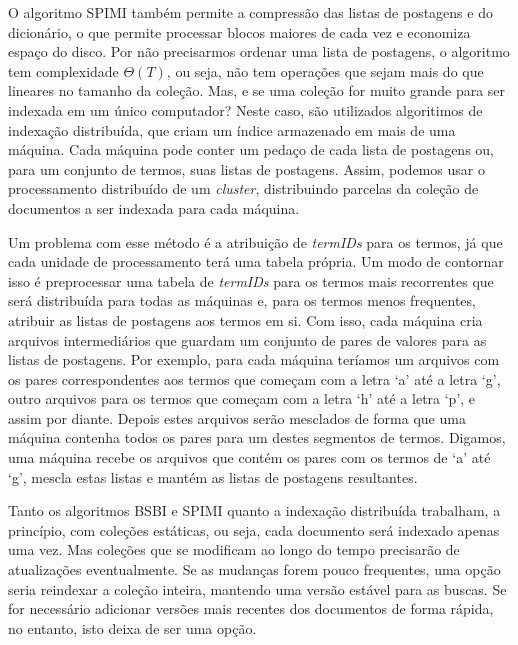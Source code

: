 O algoritmo SPIMI também permite a compressão das listas de postagens e do dicionário, o que permite processar blocos maiores de cada vez e economiza espaço do disco. Por não precisarmos ordenar uma lista de postagens, o algoritmo tem complexidade $\Theta( T )$, ou seja, não tem operações que sejam mais do que lineares no tamanho da coleção.
Mas, e se uma coleção for muito grande para ser indexada em um único computador? Neste caso, são utilizados algoritimos de indexação distribuída, que criam um índice armazenado em mais de uma máquina. Cada máquina pode conter um pedaço de cada lista de postagens ou, para um conjunto de termos, suas listas de postagens. Assim, podemos usar o processamento distribuído de um \emph{cluster}, distribuindo parcelas da coleção de documentos a ser indexada para cada máquina.

Um problema com esse método é a atribuição de \emph{termIDs} para os termos, já que cada unidade de processamento terá uma tabela própria. Um modo de contornar isso é preprocessar uma tabela de \emph{termIDs} para os termos mais recorrentes que será distribuída para todas as máquinas e, para os termos menos frequentes, atribuir as listas de postagens aos termos em si. Com isso, cada máquina cria arquivos intermediários que guardam um conjunto de pares de valores para as listas de postagens. Por exemplo, para cada máquina teríamos um arquivos com os pares correspondentes aos termos que começam com a letra `a' até a letra `g', outro arquivos para os termos que começam com a letra `h' até a letra `p', e assim por diante. Depois estes arquivos serão mesclados de forma que uma máquina contenha todos os pares para um destes segmentos de termos. Digamos, uma máquina recebe os arquivos que contém os pares com os termos de `a' até `g', mescla estas listas e mantém as listas de postagens resultantes.

Tanto os algoritmos BSBI e SPIMI quanto a indexação distribuída trabalham, a princípio, com coleções estáticas, ou seja, cada documento será indexado apenas uma vez. Mas coleções que se modificam ao longo do tempo precisarão de atualizações eventualmente. Se as mudanças forem pouco frequentes, uma opção seria reindexar a coleção inteira, mantendo uma versão estável para as buscas. Se for necessário adicionar versões mais recentes dos documentos de forma rápida, no entanto, isto deixa de ser uma opção. 

